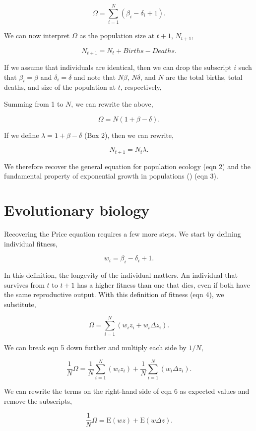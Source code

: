 \documentclass[
]{article}
\begin{document}
\[\Omega = \sum_{i=1}^{N} \left(\beta_{i} - \delta_{i} + 1 \right).\]

We can now interpret \(\Omega\) as the population size at \(t+1\),
\(N_{t+1}\),

\[N_{t+1} = N_{t} + Births - Deaths.
\tag{2}
\]

If we assume that individuals are identical, then we can drop the
subscript \(i\) such that \(\beta_{i} = \beta\) and
\(\delta_{i} = \delta\) and note that \(N\beta\), \(N\delta\), and \(N\)
are the total births, total deaths, and size of the population at \(t\),
respectively,

Summing from 1 to \(N\), we can rewrite the above,

\[\Omega = N\left(1 + \beta - \delta \right).\]

If we define \(\lambda = 1 + \beta - \delta\) (Box 2), then we can
rewrite,

\[N_{t+1} = N_{t}\lambda.
\tag{3}
\]

We therefore recover the general equation for population ecology (eqn 2)
and the fundamental property of exponential growth in populations
() (eqn 3).

\section{Evolutionary biology}\label{evolutionary-biology}

Recovering the Price equation requires a few more steps. We start by
defining individual fitness,

\[w_{i} = \beta_{i} - \delta_{i} + 1.
\tag{4}
\]

In this definition, the longevity of the individual matters. An
individual that survives from \(t\) to \(t + 1\) has a higher fitness
than one that dies, even if both have the same reproductive output. With
this definition of fitness (eqn 4), we substitute,

\[\Omega = \sum_{i=1}^{N} \left(w_{i}z_{i} + w_{i}\Delta z_{i} \right).
\tag{5}
\]

We can break eqn 5 down further and multiply each side by \(1/N\),

\[\frac{1}{N}\Omega = \frac{1}{N}\sum_{i=1}^{N} \left(w_{i}z_{i} \right) + \frac{1}{N}\sum_{i=1}^{N}\left( w_{i}\Delta z_{i} \right).
\tag{6}
\]

We can rewrite the terms on the right-hand side of eqn 6 as expected
values and remove the subscripts,

\[\frac{1}{N}\Omega = \mathrm{E}\left(w z \right) + \mathrm{E}\left( w \Delta z  \right).
\tag{7}
\]
\end{document}
